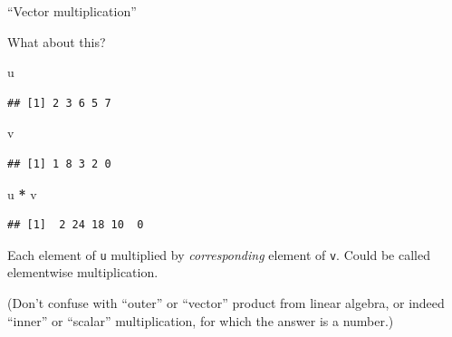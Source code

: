 \documentclass[ignorenonframetext,]{beamer}
\newenvironment{Shaded}{\begin{snugshade}}{\end{snugshade}}
\newcommand{\NormalTok}[1]{#1}
\newcommand{\OperatorTok}[1]{\textcolor[rgb]{0.81,0.36,0.00}{\textbf{#1}}}
\newcommand{\StringTok}[1]{\textcolor[rgb]{0.31,0.60,0.02}{#1}}
\begin{document}
\begin{frame}[fragile]{``Vector multiplication''}
\protect\hypertarget{vector-multiplication}{}

What about this?

\begin{Shaded}
\begin{Highlighting}[]
\NormalTok{u}
\end{Highlighting}
\end{Shaded}

\begin{verbatim}
## [1] 2 3 6 5 7
\end{verbatim}

\begin{Shaded}
\begin{Highlighting}[]
\NormalTok{v}
\end{Highlighting}
\end{Shaded}

\begin{verbatim}
## [1] 1 8 3 2 0
\end{verbatim}

\begin{Shaded}
\begin{Highlighting}[]
\NormalTok{u }\OperatorTok{*}\StringTok{ }\NormalTok{v}
\end{Highlighting}
\end{Shaded}

\begin{verbatim}
## [1]  2 24 18 10  0
\end{verbatim}

Each element of \texttt{u} multiplied by \emph{corresponding} element of
\texttt{v}. Could be called elementwise multiplication.

(Don't confuse with ``outer'' or ``vector'' product from linear algebra,
or indeed ``inner'' or ``scalar'' multiplication, for which the answer
is a number.)

\end{frame}
\end{document}
